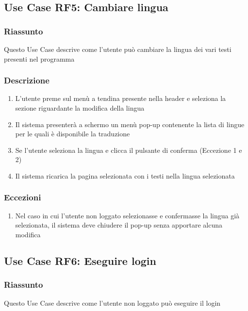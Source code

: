     \subsection{Use Case RF5: Cambiare lingua}
        \subsubsection{Riassunto}
            Questo Use Case descrive come l'utente può cambiare la lingua dei vari testi presenti nel programma
        \subsubsection{Descrizione}
            \begin{enumerate}
                \item L'utente preme sul menù a tendina presente nella header e seleziona la sezione riguardante la modifica della lingua
                \item Il sistema presenterà a schermo un menù pop-up contenente la lista di lingue per le quali è disponibile la traduzione
                \item Se l'utente seleziona la lingua e clicca il pulsante di conferma (Eccezione 1 e 2)
                \item Il sistema ricarica la pagina selezionata con i testi nella lingua selezionata
            \end{enumerate}
        \subsubsection{Eccezioni}
            \begin{enumerate}
                \item Nel caso in cui l'utente non loggato selezionasse e confermasse la lingua già selezionata, il sistema deve chiudere il pop-up senza apportare alcuna modifica
            \end{enumerate}

    \subsection{Use Case RF6: Eseguire login}
        \subsubsection{Riassunto}
            Questo Use Case descrive come l'utente non loggato può eseguire il login
